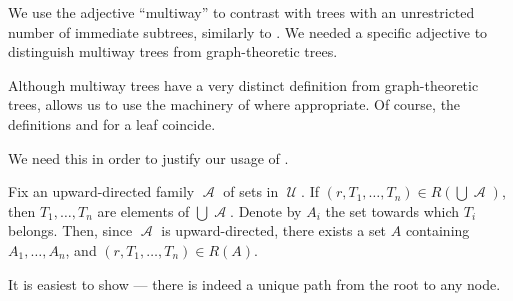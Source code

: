 \begin{comments}
  \item We use the adjective \enquote{multiway} to contrast with trees with an unrestricted number of immediate subtrees, similarly to . We needed a specific adjective to distinguish multiway trees from graph-theoretic trees.

  \item Although multiway trees have a very distinct definition from graph-theoretic trees,  allows us to use the machinery of  where appropriate. Of course, the definitions  and  for a leaf coincide.
\end{comments}
\begin{defproof}
   We need this in order to justify our usage of .

  Fix an upward-directed family \( \mscrA \) of sets in \( \mscrU \). If \( (r, T_1, \ldots, T_n) \in R(\bigcup \mscrA) \), then \( T_1, \ldots, T_n \) are elements of \( \bigcup \mscrA \). Denote by \( A_i \) the set towards which \( T_i \) belongs. Then, since \( \mscrA \) is upward-directed, there exists a set \( A \) containing \( A_1, \ldots, A_n \), and \( (r, T_1, \ldots, T_n) \in R(A) \).

   It is easiest to show  --- there is indeed a unique path from the root to any node.
\end{defproof}


